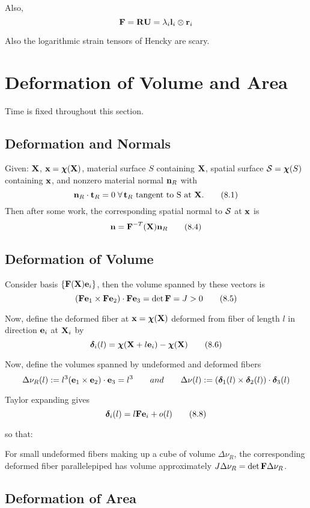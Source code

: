 \documentclass{article}
\newcommand{\Chi}{\boldsymbol{\chi}}
\begin{document}
Also,
\[
	\textbf{F} = \textbf{R}\textbf{U} = \lambda_i\textbf{l}_i\otimes\textbf{r}_i 
\]

Also the logarithmic strain tensors of Hencky are scary.

\section{Deformation of Volume and Area}
Time is fixed throughout this section.
\subsection{Deformation and Normals}
Given: $\textbf{X}$, $\x = \Chi(\X)$, material surface $S$ containing $\textbf{X}$, spatial surface $\curly{S} = \Chi(S)$ containing $\textbf{x}$, and nonzero material normal $\textbf{n}_R$ with
\[
\textbf{n}_R\cdot\textbf{t}_R = 0 \; \forall \, \textbf{t}_R\text{ tangent to S at } \textbf{X} .\tag{8.1}\label{eq:8.1}
\]
Then after some work, the corresponding spatial normal to $\mathcal{S}$ at $\textbf{x}$ is
\[
\textbf{n} = \textbf{F}^{-T}(\textbf{X})\textbf{n}_R\tag{8.4}\label{eq:8.4}
\]

\subsection{Deformation of Volume}
Consider basis $\lbrace \textbf{F}(\textbf{X})\textbf{e}_i\rbrace$, then the volume spanned by these vectors is
\[
(\textbf{F}\textbf{e}_1\times\textbf{F}\textbf{e}_2)\cdot\textbf{F}\textbf{e}_3 = \det \textbf{F} = J > 0 \tag{8.5}\label{eq:8.5}
\]

Now, define the deformed fiber at $\x = \Chi(\X)$ deformed from fiber of length $l$ in direction $\textbf{e}_i$ at $\textbf{X}_i$ by
\[
\boldsymbol{\delta}_i(l) = \Chi(\X + l\e_i) - \Chi(\X)\tag{8.6}\label{eq:8.6}
\]


Now, define the volumes spanned by undeformed and deformed fibers
\[
\Delta\nu_R(l) := l^3 (\textbf{e}_1\times\textbf{e}_2)\cdot\textbf{e}_3 = l^3 \qquad and
\qquad \Delta\nu(l) := (\boldsymbol{\delta}_1(l)\times\boldsymbol{\delta}_2(l))\cdot\boldsymbol{\delta}_3(l)
\]

Taylor expanding gives
\[
\boldsymbol{\delta}_i(l) = l\textbf{F}\textbf{e}_i + o(l) \tag{8.8}\label{eq:8.8}
\]

so that:
\begin{remark}
	For small undeformed fibers making up a cube of volume $\Delta\nu_R$, the corresponding deformed fiber parallelepiped has volume approximately $J\Delta\nu_R = \det \textbf{F}\Delta\nu_R$.
\end{remark}
\subsection{Deformation of Area}
\end{document}
